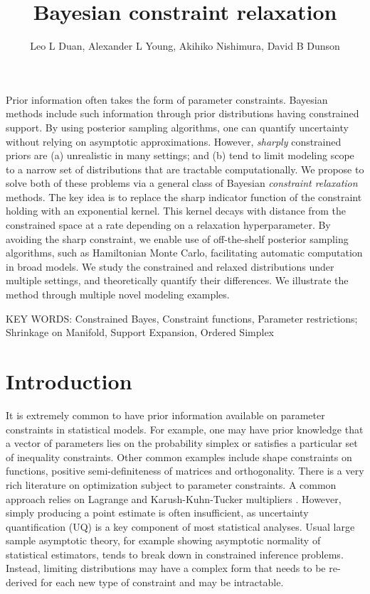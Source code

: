 \documentclass[10pt,fleqn]{article}
\title{\textbf{Bayesian constraint relaxation}}
\author{Leo L Duan, Alexander L Young, Akihiko Nishimura, David B Dunson}
\date{}
\DeclareMathOperator{\1}{\mathbbm{1}} \DeclareMathOperator{\bigO}{\mc O}
\begin{document}
\maketitle %

Prior information often takes  the form of parameter constraints. Bayesian
methods include such information through prior distributions having constrained
support. By using posterior sampling algorithms, one can quantify uncertainty
without relying on asymptotic approximations. However, {\em sharply}
constrained priors are (a) unrealistic in many settings; and (b) tend to limit
modeling scope to a narrow set of distributions that are tractable computationally.
We propose to solve both of these problems via a general class of Bayesian 
{\em constraint relaxation} methods.  The key idea is to replace the sharp
indicator function of the constraint holding with an exponential kernel.  This
kernel decays with distance from the constrained space at a rate depending on 
a relaxation hyperparameter.  By avoiding the sharp constraint, we enable use of
off-the-shelf posterior sampling algorithms, such as Hamiltonian Monte Carlo, 
facilitating automatic computation in broad models. We study the constrained and 
relaxed distributions under multiple settings, and theoretically quantify their 
differences. We illustrate the method through multiple novel modeling examples.

\vskip 12pt
        {\noindent KEY WORDS: Constrained Bayes, Constraint
        functions, Parameter restrictions; Shrinkage on Manifold, Support Expansion, Ordered Simplex}
{}

\newpage

\section{Introduction}

It is extremely common to have prior information available on parameter
constraints in statistical models. For example, one may have prior
knowledge that a vector of parameters lies on the probability simplex or
satisfies a particular set of inequality constraints. Other common examples
include shape constraints on functions, positive semi-definiteness of
matrices and orthogonality. There is a very rich literature on optimization
subject to parameter constraints. A common approach relies on Lagrange
and Karush-Kuhn-Tucker multipliers \citep{boyd2004convex}. However, simply
producing a point estimate is often insufficient, as uncertainty
quantification (UQ) is a key component of most statistical analyses. Usual
large sample asymptotic theory, for example showing asymptotic normality of
statistical estimators, tends to break down in constrained inference
problems. Instead, limiting distributions may have a complex form that
needs to be re-derived for each new type of constraint and may be
intractable.
\end{document}
